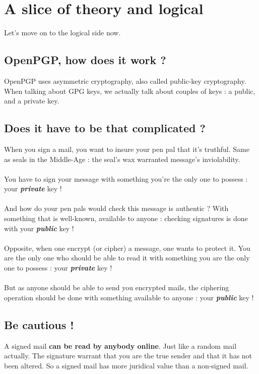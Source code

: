\chapter{A slice of theory and logical}

Let's move on to the logical side now.

\section{OpenPGP, how does it work ?}\label{openpgp-how-does-it-work}

OpenPGP uses asymmetric cryptography, also called public-key cryptography. When talking about GPG keys, we actually talk about couples of keys : a public, and a private key.

\section{Does it have to be that complicated ?}\label{does-it-have-to-be-that-complicated}

When you sign a mail, you want to insure your pen pal that it's truthful. Same as seals in the Middle-Age : the seal's wax warranted
message's inviolability.\\
\\
You have to sign your message with something you're the only one to
possess : your \textbf{\emph{private}} key !\\
\\
And how do your pen pals would check this message is authentic ? With something that is well-known, available to anyone : checking signatures
is done with your \textbf{\emph{public}} key !\\
\\
Opposite, when one encrypt (or cipher) a message, one wants to protect it. You are the only one who should be able to read it with something
you are the only one to possess : your \textbf{\emph{private}} key !\\
\\
But as anyone should be able to send you encrypted mails, the ciphering operation should be done with something available to anyone : your
\textbf{\emph{public}} key !

\section{Be cautious !}\label{be-cautious}

A signed mail \textbf{can be read by anybody online}. Just like a random mail actually. The signature warrant that you are the true sender and that it has not been altered. So a signed mail has more juridical value than a
non-signed mail.

